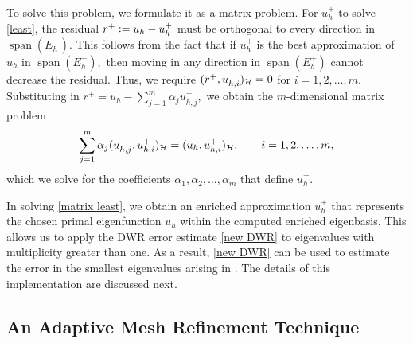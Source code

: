 To solve this problem, we formulate it as a matrix problem. For $u_h^+$ to solve \eqref{least}, the residual $r^+ \vcentcolon= u_h - u_h^+$ must be orthogonal to every direction in $\operatorname{span}(E_h^+)$. This follows from the fact that if $u_h^+$ is the best approximation of $u_h$ in $\operatorname{span}(E_h^+),$ then moving in any direction in $\operatorname{span}(E_h^+)$ cannot decrease the residual. Thus, we require $(r^+, u_{h, i}^+)_{\mathcal{H}} = 0$ for $i=1, 2, \dots, m.$ Substituting in $r^+ = u_h - \sum_{j=1}^{m} \alpha_ju_{h, j}^+,$ we obtain the $m$-dimensional matrix problem
\begin{equation} \label{matrix least}
    \sum_{j=1}^{m} \alpha_j (u_{h, j}^+, u_{h, i}^+)_{\mathcal{H}} = (u_h, u_{h, i}^+)_{\mathcal{H}}, \qquad i = 1, 2, \dots, m,
\end{equation}
which we solve for the coefficients $\alpha_1, \alpha_2, \dots, \alpha_m$ that define $u_h^+.$


In solving \eqref{matrix least}, we obtain an enriched approximation $u_h^+$ that represents the chosen primal eigenfunction $u_h$ within the computed enriched eigenbasis. This allows us to apply the DWR error estimate \eqref{new DWR} to eigenvalues with multiplicity greater than one.
As a result, \eqref{new DWR} can be used to estimate the error in the smallest eigenvalues arising in . The details of this implementation are discussed next.







\subsection{An Adaptive Mesh Refinement Technique} \label{AMR}

